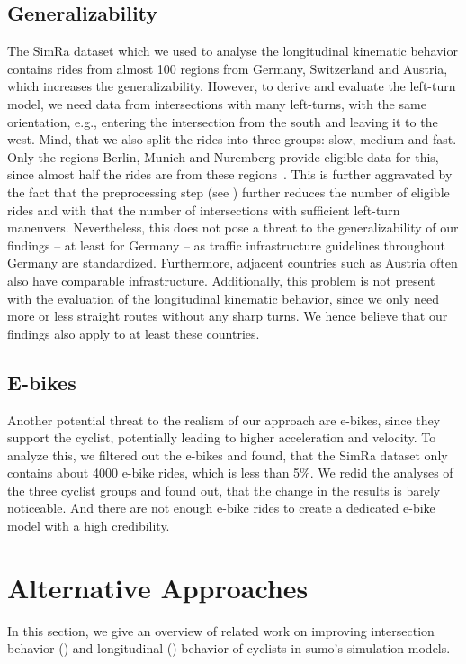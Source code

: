 \subsection{Generalizability}%
\label{subsec:problem_general}
The SimRa dataset which we used to analyse the longitudinal kinematic behavior contains rides from almost \num{100} regions from Germany, Switzerland and Austria, which increases the generalizability.
However, to derive and evaluate the left-turn model, we need data from intersections with many left-turns, with the same orientation, e.g., entering the intersection from the south and leaving it to the west.
Mind, that we also split the rides into three groups: slow, medium and fast.
Only the regions Berlin, Munich and Nuremberg provide eligible data for this, since almost half the rides are from these regions~\cite{karakaya2022cyclesense}.
This is further aggravated by the fact that the preprocessing step (see ) further reduces the number of eligible rides and with that the number of intersections with sufficient left-turn maneuvers.
Nevertheless, this does not pose a threat to the generalizability of our findings -- at least for Germany -- as traffic infrastructure guidelines throughout Germany are standardized.
Furthermore, adjacent countries such as Austria often also have comparable infrastructure.
Additionally, this problem is not present with the evaluation of the longitudinal kinematic behavior, since we only need more or less straight routes without any sharp turns.
We hence believe that our findings also apply to at least these countries.

\subsection{E-bikes}
\label{subsec:e-bikes}
Another potential threat to the realism of our approach are e-bikes, since they support the cyclist, potentially leading to higher acceleration and velocity.
To analyze this, we filtered out the e-bikes and found, that the SimRa dataset only contains about \num{4000} e-bike rides, which is less than \num{5}\%.
We redid the analyses of the three cyclist groups and found out, that the change in the results is barely noticeable.
And there are not enough e-bike rides to create a dedicated e-bike model with a high credibility.


\section{Alternative Approaches}
\label{sec:related_work_sumo}
In this section, we give an overview of related work on improving intersection behavior () and longitudinal () behavior of cyclists in \ac{sumo}'s simulation models.

